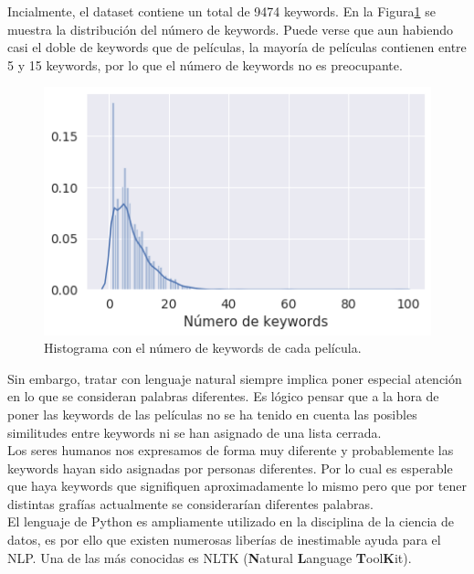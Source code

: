 Incialmente, el dataset contiene un total de 9474 keywords. En la Figura\ref{fig:keywords_histogram} se muestra la distribución del número de keywords. Puede verse que aun habiendo casi el doble de keywords que de películas, la mayoría de películas contienen entre 5 y 15 keywords, por lo que el número de keywords no es preocupante.
\begin{figure}[H]
    \centering
    \captionsetup{width=10cm}
    \includegraphics[width=12cm]{contenido/imagenes/keyword_histogram.png}
    \caption{Histograma con el número de keywords de cada película.}
    \label{fig:keywords_histogram}
\end{figure}

Sin embargo, tratar con lenguaje natural siempre implica poner especial atención en lo que se consideran palabras diferentes. Es lógico pensar que a la hora de poner las keywords de las películas no se ha tenido en cuenta las posibles similitudes entre keywords ni se han asignado de una lista cerrada.\\

Los seres humanos nos expresamos de forma muy diferente y probablemente las keywords hayan sido asignadas por personas diferentes. Por lo cual es esperable que haya keywords que signifiquen aproximadamente lo mismo pero que por tener distintas grafías actualmente se considerarían diferentes palabras.\\

El lenguaje de Python es ampliamente utilizado en la disciplina de la ciencia de datos, es por ello que existen numerosas liberías de inestimable ayuda para el NLP. Una de las más conocidas es NLTK (\textbf{N}atural \textbf{L}anguage \textbf{T}ool\textbf{K}it).